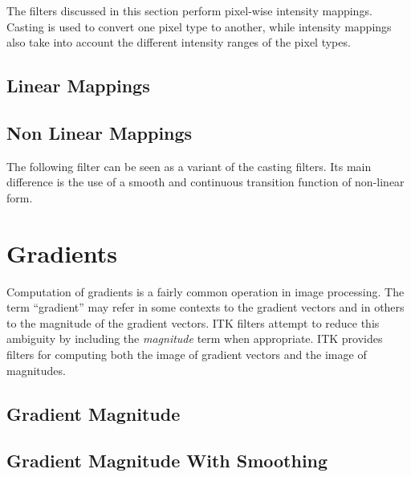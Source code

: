 The filters discussed in this section perform pixel-wise intensity mappings.
Casting is used to convert one pixel type to another, while intensity mappings
also take into account the different intensity ranges of the pixel types.

\subsection{Linear Mappings}
\label{sec:IntensityLinearMapping}

\ifitkFullVersion

\fi

\subsection{Non Linear Mappings}
\label{sec:IntensityNonLinearMapping}

The following filter can be seen as a variant of the casting filters. Its main
difference is the use of a smooth and continuous transition function of
non-linear form.

\ifitkFullVersion

\fi
  

\section{Gradients}
\label{sec:GradientFiltering}

Computation of gradients is a fairly common operation in image processing. The
term ``gradient'' may refer in some contexts to the gradient vectors and in
others to the magnitude of the gradient vectors. ITK filters attempt to
reduce this ambiguity by including the \emph{magnitude} term when
appropriate. ITK provides filters for computing both the image of gradient
vectors and the image of magnitudes.

\subsection{Gradient Magnitude}
\label{sec:GradientMagnitudeImageFilter}

\ifitkFullVersion

\fi

\subsection{Gradient Magnitude With Smoothing}
\label{sec:GradientMagnitudeRecursiveGaussianImageFilter}

\ifitkFullVersion

\fi


